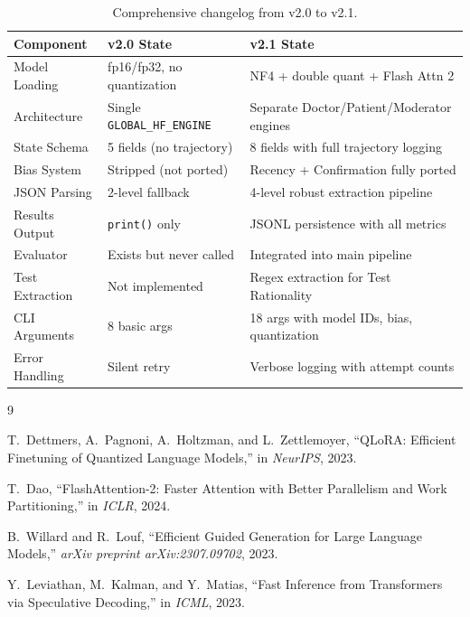 \documentclass[12pt, a4paper]{article}
\begin{document}
\begin{table}[H]
\centering
\caption{Comprehensive changelog from v2.0 to v2.1.}
\label{tab:changelog}
\begin{tabular}{p{}p{}p{}}
\toprule
\textbf{Component} & \textbf{v2.0 State} & \textbf{v2.1 State} \\
\midrule
Model Loading & fp16/fp32, no quantization & NF4 + double quant + Flash Attn 2 \\
Architecture  & Single \texttt{GLOBAL\_HF\_ENGINE} & Separate Doctor/Patient/Moderator engines \\
State Schema  & 5 fields (no trajectory) & 8 fields with full trajectory logging \\
Bias System   & Stripped (not ported) & Recency + Confirmation fully ported \\
JSON Parsing  & 2-level fallback & 4-level robust extraction pipeline \\
Results Output & \texttt{print()} only & JSONL persistence with all metrics \\
Evaluator     & Exists but never called & Integrated into main pipeline \\
Test Extraction & Not implemented & Regex extraction for Test Rationality \\
CLI Arguments & 8 basic args & 18 args with model IDs, bias, quantization \\
Error Handling & Silent retry & Verbose logging with attempt counts \\
\bottomrule
\end{tabular}
\end{table}

\begin{thebibliography}{9}

T.~Dettmers, A.~Pagnoni, A.~Holtzman, and L.~Zettlemoyer,
``QLoRA: Efficient Finetuning of Quantized Language Models,''
in \emph{NeurIPS}, 2023.

T.~Dao,
``FlashAttention-2: Faster Attention with Better Parallelism and Work Partitioning,''
in \emph{ICLR}, 2024.

B.~Willard and R.~Louf,
``Efficient Guided Generation for Large Language Models,''
\emph{arXiv preprint arXiv:2307.09702}, 2023.

Y.~Leviathan, M.~Kalman, and Y.~Matias,
``Fast Inference from Transformers via Speculative Decoding,''
in \emph{ICML}, 2023.

\end{thebibliography}
\end{document}

